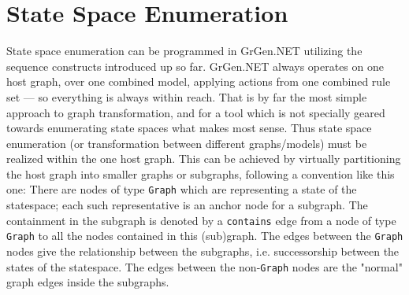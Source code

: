 \section{State Space Enumeration}\label{sec:statespaceenum}

State space enumeration can be programmed in GrGen.NET utilizing the sequence constructs introduced up so far.
GrGen.NET always operates on one host graph, over one combined model, applying actions from one combined rule set --- so everything is always within reach.
That is by far the most simple approach to graph transformation, and for a tool which is not specially geared towards enumerating state spaces what makes most sense.
Thus state space enumeration (or transformation between different graphs/models) must be realized within the one host graph.
This can be achieved by virtually partitioning the host graph into smaller graphs or subgraphs, following a convention like this one:
There are nodes of type \texttt{Graph} which are representing a state of the statespace; each such representative is an anchor node for a subgraph.
The containment in the subgraph is denoted by a \texttt{contains} edge from a node of type \texttt{Graph} to all the nodes contained in this (sub)graph.
The edges between the \texttt{Graph} nodes give the relationship between the subgraphs, i.e. successorship between the states of the statespace.
The edges between the non-\texttt{Graph} nodes are the "normal" graph edges inside the subgraphs.


